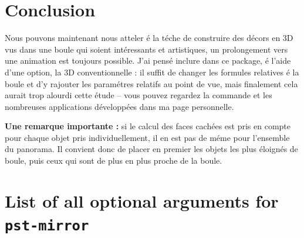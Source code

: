 \documentclass[fontsize=11pt,english,BCOR=10mm,DIV=12,bibliography=totoc,parskip=false,headings=small,
    headinclude=false,footinclude=false,oneside]{pst-doc}
\begin{document}
\section{Conclusion}
Nous pouvons maintenant nous atteler é la téche de construire des
décors en 3D vus dans une boule qui soient intéressants et
artistiques, un prolongement vers une animation est toujours possible.
J'ai pensé inclure dans ce package, é l'aide d'une option,
la 3D conventionnelle : il suffit de changer les formules
relatives é la boule et d'y rajouter les paramétres relatifs au
point de vue, mais finalement cela aurait trop alourdi cette
étude -- vous pouvez regardez la commande  et les
nombreuses applications développées dans ma page personnelle.

\textbf{Une remarque importante :} si le calcul des faces cachées
est pris en compte pour chaque objet pris individuellement, il en
est pas de méme pour l'ensemble du panorama. Il convient donc de
placer en premier les objets les plus éloignés de boule, puis ceux
qui sont de plus en plus proche de la boule.


\section{List of all optional arguments for \texttt{pst-mirror}}


\nocite{*}

\bgroup
\raggedright
\printbibliography
\egroup

\printindex
\end{document}
